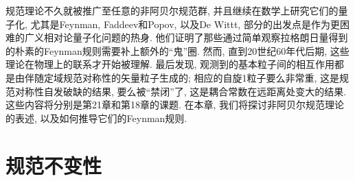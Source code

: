 规范理论不久就被推广至任意的非阿贝尔规范群,\cite{2} 并且继续在数学上研究它们的量子化, 
尤其是Feynman,\cite{3} Faddeev和Popov,\cite{4} 以及De Wittt,\cite{5} 部分的出发点是作为更困难的广义相对论量子化问题的热身. 
他们证明了那些通过简单观察拉格朗日量得到的朴素的Feynman规则需要补上额外的``鬼''圈. 
然而, 直到20世纪60年代后期, 这些理论在物理上的联系才开始被理解. 
最后发现, {}观测到的基本粒子间的相互作用都是由伴随定域规范对称性的矢量粒子生成的; 
相应的自旋1粒子要么非常重, 这是规范对称性自发破缺的结果, 要么被``禁闭''了, 这是耦合常数在远距离处变大的结果. 
这些内容将分别是第21章和第18章的课题. 在本章, 我们将探讨非阿贝尔规范理论的表述, 以及如何推导它们的Feynman规则.

\section{规范不变性}

\setcounter{footnote}{1}

